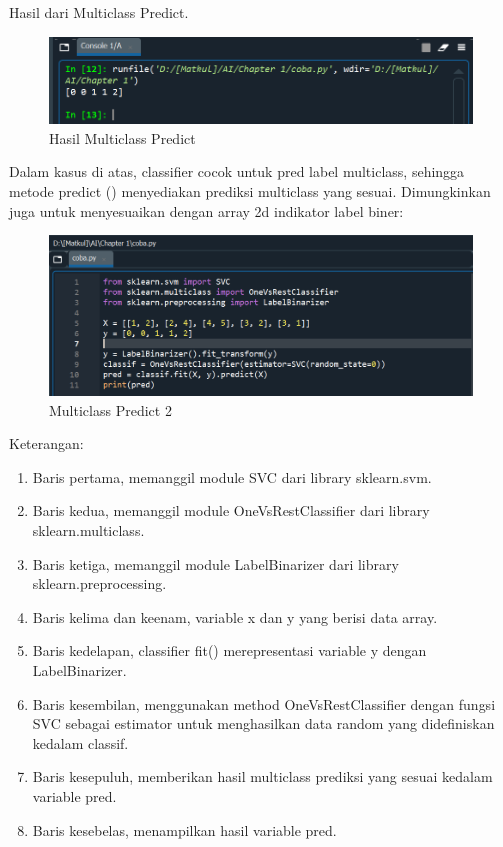 \par Hasil dari Multiclass Predict.

    \begin{figure}[H]
    \centering
    \includegraphics[width=13cm]{figures/chapter1/27.PNG}
    \caption{Hasil Multiclass Predict}
    \end{figure}

\par Dalam kasus di atas, classifier cocok untuk pred label multiclass, sehingga metode predict () menyediakan prediksi multiclass yang sesuai. Dimungkinkan juga untuk menyesuaikan dengan array 2d indikator label biner:

    \begin{figure}[H]
    \centering
    \includegraphics[width=13cm]{figures/chapter1/28.PNG}
    \caption{Multiclass Predict 2}
    \end{figure}
    
\par Keterangan:
    \begin{enumerate}
        \item Baris pertama, memanggil module SVC dari library sklearn.svm.
        \item Baris kedua, memanggil module OneVsRestClassifier dari library sklearn.multiclass.
        \item Baris ketiga, memanggil module LabelBinarizer dari library sklearn.preprocessing.
        \item Baris kelima dan keenam, variable x dan y yang berisi data array.
        \item Baris kedelapan, classifier fit() merepresentasi variable y dengan LabelBinarizer.
        \item Baris kesembilan, menggunakan method OneVsRestClassifier dengan fungsi SVC sebagai estimator untuk menghasilkan data random yang didefiniskan kedalam classif.
        \item Baris kesepuluh, memberikan hasil multiclass prediksi yang sesuai kedalam variable pred.
        \item Baris kesebelas, menampilkan hasil variable pred. 
    \end{enumerate}

